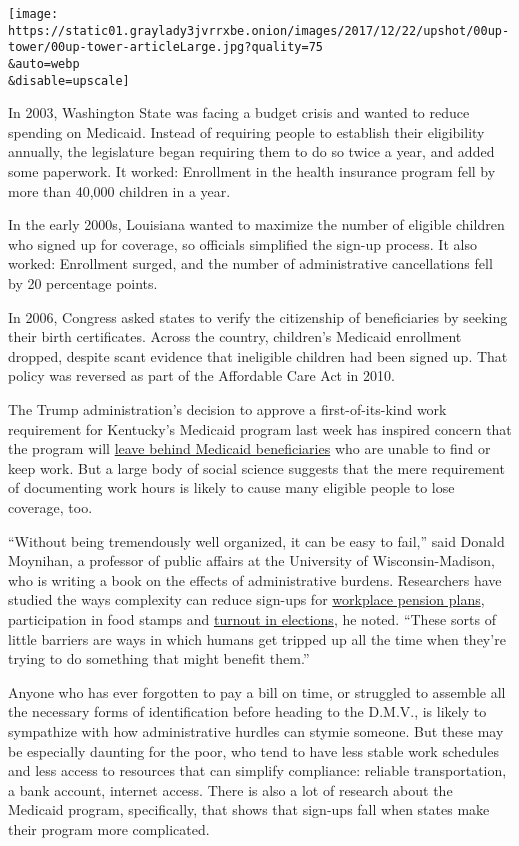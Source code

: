 \texttt{[image: https://static01.graylady3jvrrxbe.onion/images/2017/12/22/upshot/00up-tower/00up-tower-articleLarge.jpg?quality=75\\\&auto=webp\\\&disable=upscale]}

In 2003, Washington State was facing a budget crisis and wanted to
reduce spending on Medicaid. Instead of requiring people to establish
their eligibility annually, the legislature began requiring them to do
so twice a year, and added some paperwork. It worked: Enrollment in the
health insurance program fell by more than 40,000 children in a year.

In the early 2000s, Louisiana wanted to maximize the number of eligible
children who signed up for coverage, so officials simplified the sign-up
process. It also worked: Enrollment surged, and the number of
administrative cancellations fell by 20 percentage points.

In 2006, Congress asked states to verify the citizenship of
beneficiaries by seeking their birth certificates. Across the country,
children's Medicaid enrollment dropped, despite scant evidence that
ineligible children had been signed up. That policy was reversed as part
of the Affordable Care Act in 2010.

The Trump administration's decision to approve a first-of-its-kind work
requirement for Kentucky's Medicaid program last week has inspired
concern that the program will
\href{https://www.nytimes3xbfgragh.onion/2018/01/11/upshot/medicaid-work-requirements-trump.html?_r=0}{leave
behind Medicaid beneficiaries} who are unable to find or keep work. But
a large body of social science suggests that the mere requirement of
documenting work hours is likely to cause many eligible people to lose
coverage, too.

``Without being tremendously well organized, it can be easy to fail,''
said Donald Moynihan, a professor of public affairs at the University of
Wisconsin-Madison, who is writing a book on the effects of
administrative burdens. Researchers have studied the ways complexity can
reduce sign-ups for
\href{https://institutional.vanguard.com/iam/pdf/CRRATEP_AutoEnrollDefault.pdf?cbdForceDomain=false}{workplace
pension plans}, participation in food stamps and
\href{http://law.osu.edu/electionlaw/litigation/documents/Ohio559.pdf}{turnout
in elections}, he noted. ``These sorts of little barriers are ways in
which humans get tripped up all the time when they're trying to do
something that might benefit them.''

Anyone who has ever forgotten to pay a bill on time, or struggled to
assemble all the necessary forms of identification before heading to the
D.M.V., is likely to sympathize with how administrative hurdles can
stymie someone. But these may be especially daunting for the poor, who
tend to have less stable work schedules and less access to resources
that can simplify compliance: reliable transportation, a bank account,
internet access. There is also a lot of research about the Medicaid
program, specifically, that shows that sign-ups fall when states make
their program more complicated.

